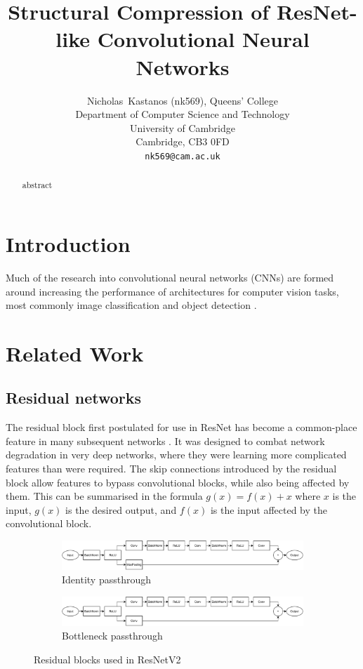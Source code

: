 \documentclass{article}
\title{Structural Compression of ResNet-like Convolutional Neural Networks}
\author{%
	Nicholas~Kastanos (nk569), Queens' College \\
	Department of Computer Science and Technology\\
	University of Cambridge\\
	Cambridge, CB3 0FD\\
	\texttt{nk569@cam.ac.uk} \\
}
\begin{document}
	
	\maketitle
	
	\begin{abstract}
		abstract
	\end{abstract}
	
	\section{Introduction}
	
	Much of the research into convolutional neural networks (CNNs) are formed around increasing the performance of architectures for computer vision tasks, most commonly image classification and object detection \cite{adscnet, vgg, yolo, inception}. 
	
	
	\section{Related Work}
	\subsection{Residual networks}
	
	The residual block first postulated for use in ResNet has become a common-place feature in many subsequent networks \cite{resnetv1,inception, densenet}. It was designed to combat network degradation in very deep networks, where they were learning more complicated features than were required. The skip connections introduced by the residual block allow features to bypass convolutional blocks, while also being affected by them. This can be summarised in the formula $g(x) = f(x) + x$ where $x$ is the input, $g(x)$ is the desired output, and $f(x)$ is the input affected by the convolutional block.
	
	\begin{figure}[b!]
		\centering
		\begin{subfigure}[b]{\textwidth}
			\centering
			\includegraphics[width=\textwidth]{images/identity_base.pdf}
			\caption{Identity passthrough}
			\label{fig:resnet-identity}
		\end{subfigure}
		\vfill
		\begin{subfigure}[b]{\textwidth}
			\centering
			\includegraphics[width=\textwidth]{images/bottleneck_base.pdf}
			\caption{Bottleneck passthrough}
			\label{fig:resnet-bottleneck}
		\end{subfigure}
		\caption{Residual blocks used in ResNetV2}
		\label{fig:resnet}
	\end{figure}
	
\end{document}
